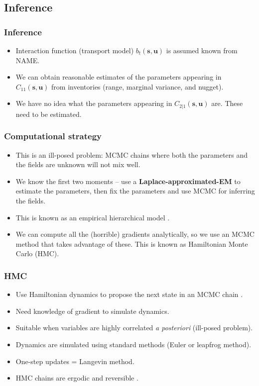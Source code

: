 \documentclass{beamer}
\newcommand{\svec} {\textbf{s}}
\newcommand{\uvec} {\textbf{u}}
\begin{document}
\subsection{Inference}

\begin{frame}
\frametitle{Inference}

\begin{itemize}
\item Interaction function (transport model) $b_t(\svec,\uvec)$ is assumed known from NAME. \vfill
\item We can obtain reasonable estimates of the parameters appearing in $C_{11}(\svec,\uvec)$ from inventories (range, marginal variance, and nugget). \vfill
\item We have no idea what the parameters appearing in $C_{2|1}(\svec,\uvec)$ are. These need to be estimated. \vfill
\end{itemize}
\end{frame}

\begin{frame}
\frametitle{Computational strategy}

\begin{itemize}
\item This is an ill-posed problem: MCMC chains where both the parameters and the fields are unknown will not mix well. \pause \vfill
\item We know the first two moments -- use a {\bf Laplace-approximated-EM} to estimate the parameters, then fix the parameters and use MCMC for inferring the fields. \vfill \pause
\item This is known as an empirical hierarchical model \citep[EHM;][]{CressieWikle2011}. \vfill \pause
\item We can compute all the (horrible) gradients analytically, so we use an MCMC method that takes advantage of these. This is known as Hamiltonian Monte Carlo (HMC). \vfill
\end{itemize}
\end{frame}

\begin{frame}
\frametitle{HMC}

\begin{itemize}
\item Use Hamiltonian dynamics to propose the next state in an MCMC chain \citep{Duane_1987}.
\item Need knowledge of gradient to simulate dynamics.
\item Suitable when variables are highly correlated \textit{a posteriori} (ill-posed problem).
\item Dynamics are simulated using standard methods (Euler or leapfrog method).
\item One-step updates = Langevin method.
\item HMC chains are ergodic and reversible \citep{Neal_2011}.
\end{itemize}
\end{frame}
\end{document}
